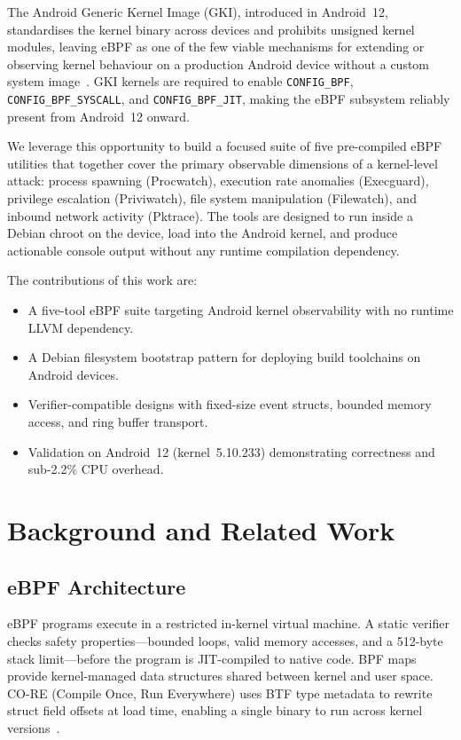 \documentclass[conference]{IEEEtran}
\begin{document}
The Android Generic Kernel Image (GKI), introduced in Android~12, standardises the kernel binary across devices and prohibits unsigned kernel modules, leaving eBPF as one of the few viable mechanisms for extending or observing kernel behaviour on a production Android device without a custom system image~\cite{android_gki}. GKI kernels are required to enable \texttt{CONFIG\_BPF}, \texttt{CONFIG\_BPF\_SYSCALL}, and \texttt{CONFIG\_BPF\_JIT}, making the eBPF subsystem reliably present from Android~12 onward.

We leverage this opportunity to build a focused suite of five pre-compiled eBPF utilities that together cover the primary observable dimensions of a kernel-level attack: process spawning (Procwatch), execution rate anomalies (Execguard), privilege escalation (Priviwatch), file system manipulation (Filewatch), and inbound network activity (Pktrace). The tools are designed to run inside a Debian chroot on the device, load into the Android kernel, and produce actionable console output without any runtime compilation dependency.

The contributions of this work are:
\begin{itemize}
  \item A five-tool eBPF suite targeting Android kernel observability with no runtime LLVM dependency.
  \item A Debian filesystem bootstrap pattern for deploying build toolchains on Android devices.
  \item Verifier-compatible designs with fixed-size event structs, bounded memory access, and ring buffer transport.
  \item Validation on Android~12 (kernel~5.10.233) demonstrating correctness and sub-2.2\% CPU overhead.
\end{itemize}

\section{Background and Related Work}

\subsection{eBPF Architecture}
eBPF programs execute in a restricted in-kernel virtual machine. A static verifier checks safety properties---bounded loops, valid memory accesses, and a 512-byte stack limit---before the program is JIT-compiled to native code. BPF maps provide kernel-managed data structures shared between kernel and user space. CO-RE (Compile Once, Run Everywhere) uses BTF type metadata to rewrite struct field offsets at load time, enabling a single binary to run across kernel versions~\cite{ebpf_linux_doc,libbpf_doc}.
\end{document}
